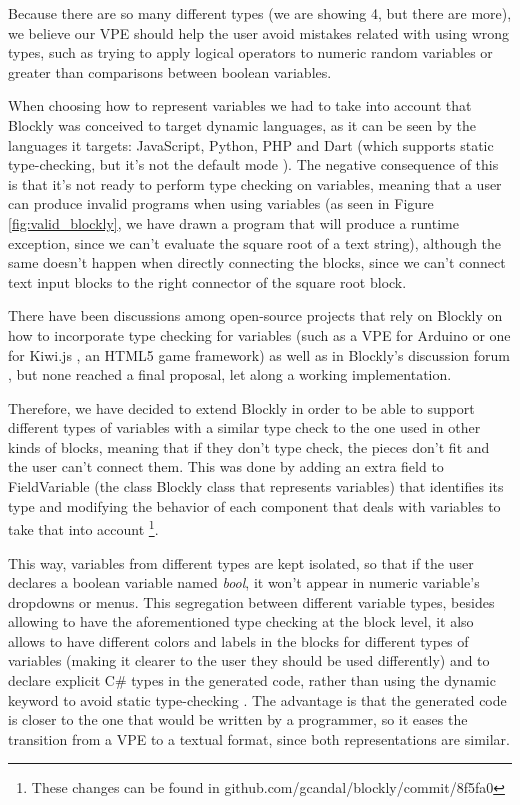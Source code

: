 Because there are so many different types (we are showing 4, but there are more),
we believe our VPE should help the user avoid mistakes related with using wrong
types, such as trying to apply logical operators to numeric random variables or
greater than comparisons between boolean variables.

When choosing how to represent variables we had to take into account that
Blockly was conceived to target dynamic languages, as it can be seen by the languages
it targets: JavaScript, Python, PHP and Dart (which supports static type-checking,
but it's not the default mode \cite{dart}). The negative consequence of this is that it's
not ready to perform type checking on variables, meaning that a user can
produce invalid programs when using variables (as seen in Figure \ref{fig:valid_blockly}, we have
drawn a program that will produce a runtime exception, since we can't evaluate
the square root of a text string), although the same doesn't happen when
directly connecting the blocks, since we can't connect text input blocks to the
right connector of the square root block.

There have been discussions among open-source projects that rely on Blockly on how
to incorporate type checking for variables (such as a VPE for Arduino \cite{bduino}
or one for Kiwi.js \cite{gbl}, an HTML5 game framework) as well as in Blockly's
discussion forum \cite{gbl2}, but none reached a final proposal, let along a working
implementation.

Therefore, we have decided to extend Blockly in order to be able to support
different types of variables with a similar type check to the one used in other
kinds of blocks, meaning that if they don't type check, the pieces don't fit and the user
can't connect them. This was done by adding an extra field to FieldVariable
(the class Blockly class that represents variables) that identifies its type and
modifying the behavior of each component that deals with variables to take that
into account \footnote{These changes can be found in github.com/gcandal/blockly/commit/8f5fa0}.

This way, variables from different types are kept isolated, so that if the user
declares a boolean variable named \textit{bool}, it won't appear in numeric
variable's dropdowns or menus. This segregation between different variable types,
besides allowing to have the aforementioned type checking at the block level, it
also allows to have different colors and labels in the blocks for different types of variables
(making it clearer to the user they should be used differently) and to declare
explicit C# types in the generated code, rather than using
the dynamic keyword to avoid static type-checking \cite{cdyn}. The advantage is that
the generated code is closer to the one that would be written by a programmer,
so it eases the transition from a VPE to a textual format, since both representations
are similar.

